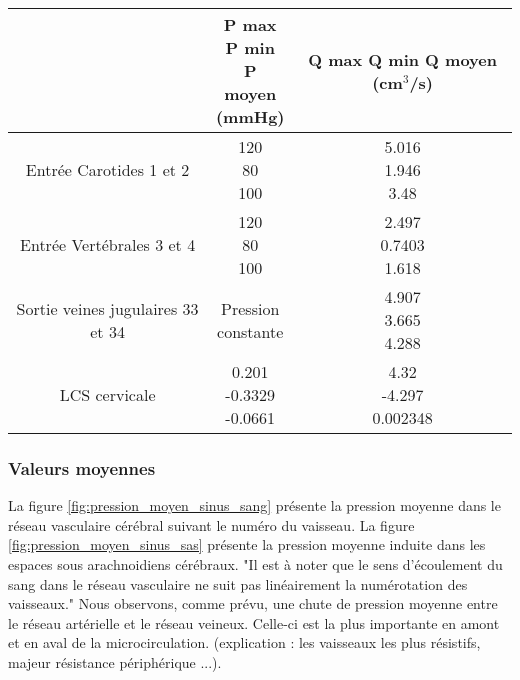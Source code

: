 \documentclass[french]{report}
\begin{document}
\begin{center}
    \begin{tabular}{  c c  c }
      \hline
      \thead{} & \thead{P max \\ P min \\ P moyen \\ (mmHg)} & \thead{Q max \\ Q min \\Q moyen \\ (cm$^{3}$/s)} \\
      \hline
      Entrée Carotides 1 et 2 & \makecell{120 \\ 80 \\ 100} & \makecell{5.016 \\ 1.946 \\ 3.48} \\
      \hline
      Entrée Vertébrales 3 et 4 & \makecell{120 \\ 80 \\ 100} & \makecell{2.497 \\ 0.7403 \\ 1.618} \\     
      \hline
      Sortie veines jugulaires 33 et 34 & \makecell{Pression \\ constante} & \makecell{4.907 \\ 3.665 \\ 4.288} \\ 
      \hline
      LCS cervicale & \makecell{0.201 \\ -0.3329 \\ -0.0661} & \makecell{4.32 \\ -4.297 \\ 0.002348} \\
      \hline
      
    \end{tabular}
\end{center}


\subsubsection{Valeurs moyennes}

La figure \ref{fig:pression_moyen_sinus_sang} présente la pression moyenne dans le réseau vasculaire cérébral suivant le numéro du vaisseau.
La figure \ref{fig:pression_moyen_sinus_sas} présente la pression moyenne induite dans les espaces sous arachnoidiens cérébraux.
"Il est à noter que le sens d'écoulement du sang dans le réseau vasculaire ne suit pas linéairement la numérotation des vaisseaux."
Nous observons, comme prévu, une chute de pression moyenne entre le réseau artérielle et le réseau veineux. Celle-ci est la plus importante en amont et en aval de la microcirculation.  (explication : les vaisseaux les plus résistifs, majeur résistance périphérique ...).
\end{document}
